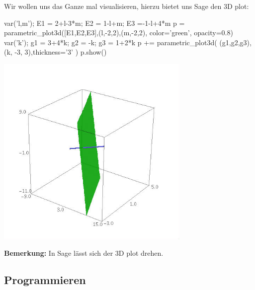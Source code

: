\documentclass[fontsize=12pt,paper=a4,twoside,bibtotoc,idxtotoc,
liststotoc,pagesize,BCOR1.2cm,DIV15,chapterprefix,pagesize=pdftex]{scrbook}
\begin{document}
Wir wollen uns das Ganze mal visualisieren, hierzu bietet uns Sage den 3D plot:
\begin{sagein}
var('l,m'); E1 = 2+l-3*m; E2 = 1-l+m; E3 =-1-l+4*m
p = parametric_plot3d([E1,E2,E3],(l,-2,2),(m,-2,2), color='green', opacity=0.8)
var('k'); g1 = 3+4*k; g2 = -k; g3 = 1+2*k
p += parametric_plot3d( (g1,g2,g3), (k, -3, 3),thickness='3' ) 
p.show()
\end{sagein}
\begin{center}
\includegraphics[width=0.7\textwidth]{ebene2}
\end{center}
\textbf{Bemerkung:} In Sage lässt sich der 3D plot drehen.
\newpage

\subsection{Programmieren}
\end{document}
